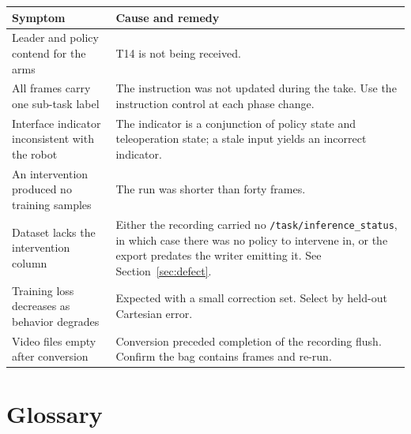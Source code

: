 \documentclass[11pt,a4paper]{article}
\begin{document}
{\small
\begin{longtable}{@{}p{5.4cm}p{9.4cm}@{}}
\toprule
\textbf{Symptom} & \textbf{Cause and remedy}\\
\midrule
\endhead
Leader and policy contend for the arms & T14 is not being received.\\
All frames carry one sub-task label & The instruction was not updated during the take. Use the instruction control at each phase change.\\
Interface indicator inconsistent with the robot & The indicator is a conjunction of policy state and teleoperation state; a stale input yields an incorrect indicator.\\
An intervention produced no training samples & The run was shorter than forty frames.\\
Dataset lacks the intervention column & Either the recording carried no \texttt{/task/inference\_status}, in which case there was no policy to intervene in, or the export predates the writer emitting it. See Section~\ref{sec:defect}.\\
Training loss decreases as behavior degrades & Expected with a small correction set. Select by held-out Cartesian error.\\
Video files empty after conversion & Conversion preceded completion of the recording flush. Confirm the bag contains frames and re-run.\\
\bottomrule
\end{longtable}}

\appendix
\section{Glossary}
\end{document}
